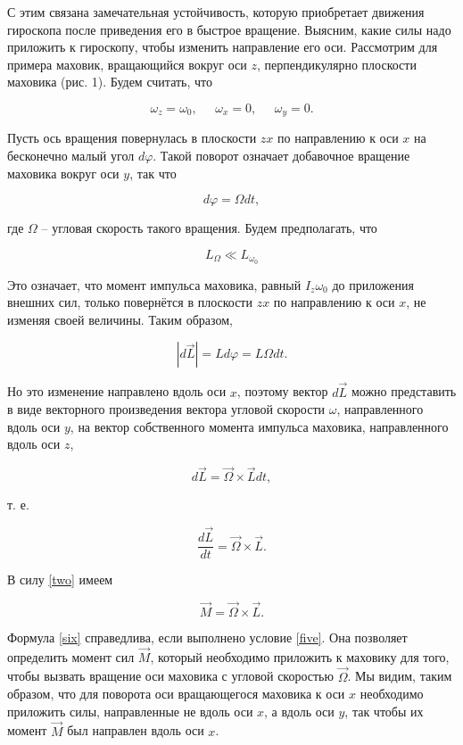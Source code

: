     С этим связана замечательная устойчивость, которую приобретает движения
    гироскопа после приведения его в быстрое вращение. 
    Выясним, какие силы надо приложить к гироскопу, чтобы изменить
    направление его оси. Рассмотрим для 
    примера маховик, вращающийся вокруг оси $ z $, перпендикулярно
    плоскости маховика (рис. 1). Будем считать, что

\[
\omega_z = \omega_0, \;\;\;\;\; \omega_x = 0, \;\;\;\;\; \omega_y = 0.
\]

    \noindent Пусть ось вращения повернулась в плоскости $ zx $ по направлению к оси $ x $ на бесконечно малый угол $ d\varphi $. Такой поворот означает добавочное вращение маховика вокруг оси $ y $, так что

\[
d\varphi=\Omega dt,
\]

    где $ \Omega $ -- угловая скорость такого вращения. Будем предполагать, что

\begin{equation}
L_\Omega \ll L_{\omega_0}
\label{five}
\end{equation}

    Это означает, что момент импульса маховика, равный $ I_z\omega_0 $ до приложения внешних сил, только повернётся в плоскости $ zx $ по направлению к оси $ x $, не изменяя своей величины. Таким образом, 

\[
\left|d\vec{L}\right| = Ld\varphi = L\Omega dt.
\]

    Но это изменение направлено вдоль оси $ x $, поэтому вектор $ d\vec{L} $ можно представить в виде векторного произведения вектора угловой скорости $ \omega $, направленного вдоль оси $ y $, на вектор собственного момента импульса маховика, направленного вдоль оси $ z $,

\[
d\vec{L}=\vec{\Omega} \times \vec{L} dt,
\]

    т. е.

\[
\frac{d\vec{L}}{dt} = \vec{\Omega} \times \vec{L}.
\]

    В силу \eqref{two} имеем

\begin{equation}
\vec{M} = \vec{\Omega} \times \vec{L}.
\label{six}
\end{equation}

    Формула \eqref{six} справедлива, если выполнено условие \eqref{five}. Она позволяет определить момент сил $ \vec{M} $, который необходимо приложить к маховику для того, чтобы вызвать вращение оси маховика с угловой скоростью $ \vec{\Omega} $. Мы видим, таким образом, что для поворота оси вращающегося маховика к оси $ x $ необходимо приложить силы, направленные не вдоль оси $ x $, а вдоль оси $ y $, так чтобы их момент $ \vec{M} $ был направлен вдоль оси $ x $.

